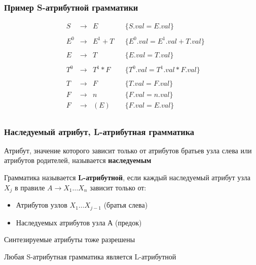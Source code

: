 \documentclass{beamer}
\begin{document}
\begin{frame}[fragile]
  \transwipe[direction=90]
  \frametitle{Пример S-атрибутной грамматики}
$$
\begin{array}{ccclll}
&S  & \rightarrow & E       &                                &\{S.val = E.val\}\\~\\

&E^0& \rightarrow & E^1 + T &                                &\{E^0.val = E^1.val + T.val\}\\~\\ 

&E  & \rightarrow & T       &                                &\{E.val = T.val\}\\~\\

&T^0& \rightarrow & T^1 * F &                                &\{T^0.val = T^1.val * F.val\}\\~\\

&T  & \rightarrow & F       &                                &\{T.val = F.val\}\\
&F  & \rightarrow & n       &                                &\{F.val = n.val\}\\
&F  & \rightarrow & (E)     &                                &\{F.val = E.val\}\\

\end{array}
$$  
\end{frame}

\begin{frame}[fragile]
  \transwipe[direction=90]
  \frametitle{Наследуемый атрибут, L-атрибутная грамматика}
Атрибут, значение которого зависит только от атрибутов братьев узла слева или атрибутов родителей, называется \textbf{наследуемым}
    
\vfill 

Грамматика называется \textbf{L-атрибутной}, если каждый наследуемый
атрибут узла $X_j$ в правиле $A \to X_1 \dots X_n$ зависит только от: 

\begin{itemize}
  \item Атрибутов узлов $X_1 \dots X_{j-1}$ (братья слева)
  \item Наследуемых атрибутов узла $А$ (предок)
\end{itemize}

\vfill 

Синтезируемые атрибуты тоже разрешены

\vfill 

Любая S-атрибутная грамматика является L-атрибутной
\end{frame}
\end{document}

